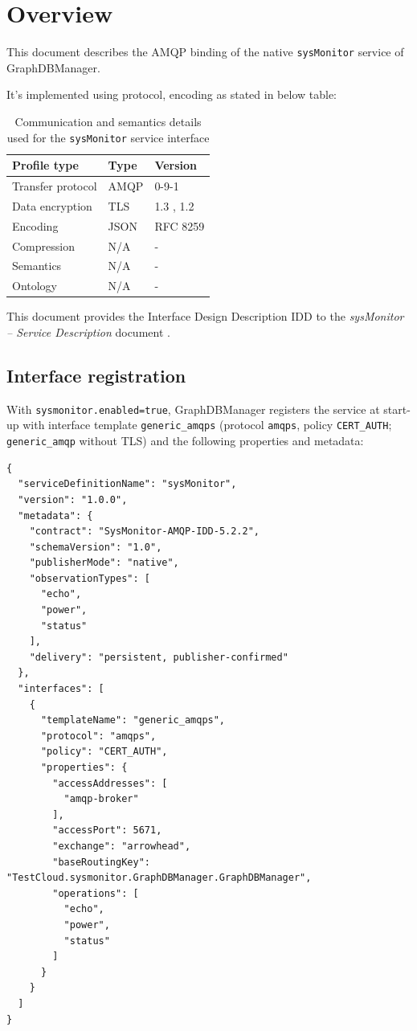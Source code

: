\documentclass[a4paper]{arrowhead}
\begin{document}
\section{Overview}
\label{sec:overview}

This document describes the AMQP binding of the native \texttt{sysMonitor} service of GraphDBManager.

It's implemented using protocol, encoding as stated in below table:
\begin{table}[ht!]
  \centering
  \begin{tabular}{|l|l|l|}
    \hline
    \rowcolor{gray!33} Profile type & Type & Version \\ \hline
    Transfer protocol & AMQP & 0-9-1 \cite{amqp091} \\ \hline
    Data encryption & TLS & 1.3 \cite{rfc8446}, 1.2 \cite{rfc5246} \\ \hline
    Encoding & JSON & RFC 8259 \cite{rfc8259} \\ \hline
    Compression & N/A & - \\ \hline
    Semantics & N/A & - \\ \hline
    Ontology & N/A & - \\ \hline
  \end{tabular}
  \caption{Communication and semantics details used for the \texttt{sysMonitor} service interface}
  \label{tab:comunication_semantics_profile}
\end{table}

This document provides the Interface Design Description IDD to the \textit{sysMonitor -- Service Description} document \cite{gdm-sysMonitor-sd}.

\subsection{Interface registration}

With \texttt{sysmonitor.enabled=true}, GraphDBManager registers the service at start-up with interface template \texttt{generic\_\allowbreak{}amqps} (protocol \texttt{amqps}, policy \texttt{CERT\_\allowbreak{}AUTH}; \texttt{generic\_\allowbreak{}amqp} without TLS) and the following properties and metadata:

\begin{lstlisting}[caption={Registered service instance (TestCloud).}]
{
  "serviceDefinitionName": "sysMonitor",
  "version": "1.0.0",
  "metadata": {
    "contract": "SysMonitor-AMQP-IDD-5.2.2",
    "schemaVersion": "1.0",
    "publisherMode": "native",
    "observationTypes": [
      "echo",
      "power",
      "status"
    ],
    "delivery": "persistent, publisher-confirmed"
  },
  "interfaces": [
    {
      "templateName": "generic_amqps",
      "protocol": "amqps",
      "policy": "CERT_AUTH",
      "properties": {
        "accessAddresses": [
          "amqp-broker"
        ],
        "accessPort": 5671,
        "exchange": "arrowhead",
        "baseRoutingKey": "TestCloud.sysmonitor.GraphDBManager.GraphDBManager",
        "operations": [
          "echo",
          "power",
          "status"
        ]
      }
    }
  ]
}
\end{lstlisting}
\end{document}

